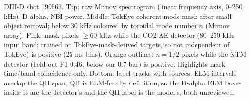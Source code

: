 \caption{DIII-D shot 199563. Top: raw Mirnov spectrogram (linear frequency axis, 0--250 kHz), D-alpha, NBI power. Middle: TokEye coherent-mode mask after small-object removal; below 30 kHz coloured by toroidal mode number $n$ (Mirnov array). Pink: mask pixels $\geq$60 kHz while the CO2 AE detector (80--250 kHz input band; trained on TokEye-mask-derived targets, so not independent of TokEye) is positive (25 ms bins). Orange outlines: $n=1/2$ pixels while the NTM detector (held-out F1 0.46, below our 0.7 bar) is positive. Highlights mark time/band coincidence only. Bottom: label tracks with sources. ELM intervals overlap the QH span; QH is ELM-free by definition, so the D-alpha ELM boxes inside it are the detector's and the QH label is the model's, both unreviewed.}
\label{fig:interpreter-199563}

